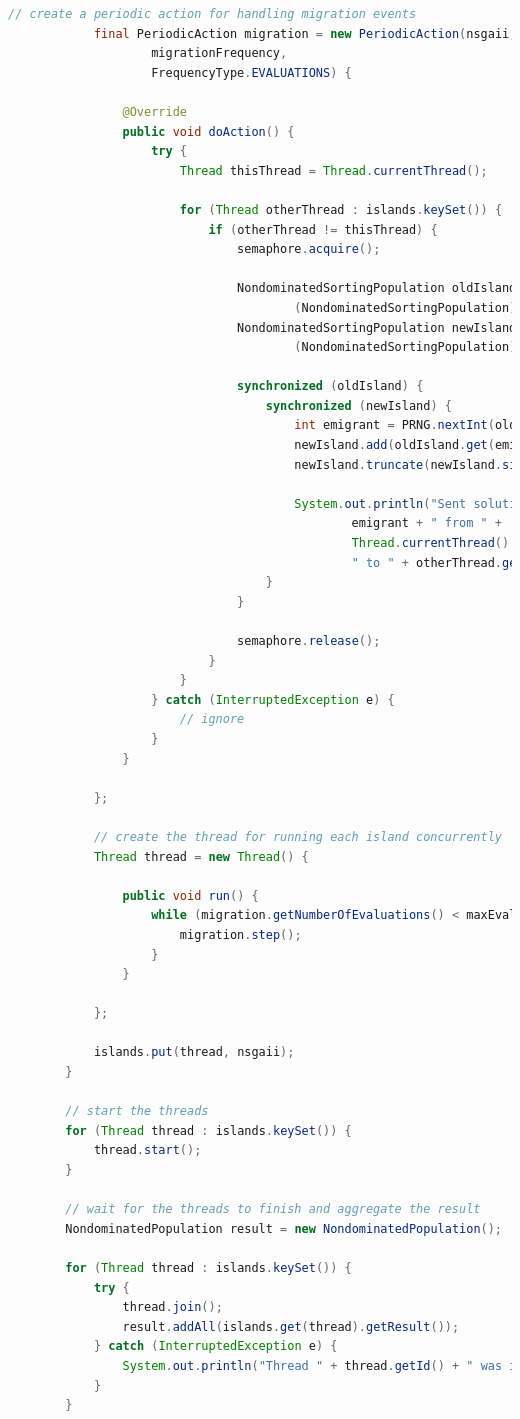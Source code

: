 {\begin{lstlisting}[language=Java]
			// create a periodic action for handling migration events
			final PeriodicAction migration = new PeriodicAction(nsgaii,
					migrationFrequency,
					FrequencyType.EVALUATIONS) {

				@Override
				public void doAction() {
					try {
						Thread thisThread = Thread.currentThread();
						
						for (Thread otherThread : islands.keySet()) {
							if (otherThread != thisThread) {
								semaphore.acquire();
								
								NondominatedSortingPopulation oldIsland = 
										(NondominatedSortingPopulation)islands.get(thisThread).getPopulation();
								NondominatedSortingPopulation newIsland = 
										(NondominatedSortingPopulation)islands.get(otherThread).getPopulation();
								
								synchronized (oldIsland) {
									synchronized (newIsland) {
										int emigrant = PRNG.nextInt(oldIsland.size());
										newIsland.add(oldIsland.get(emigrant).copy());
										newIsland.truncate(newIsland.size()-1);
										
										System.out.println("Sent solution " +
												emigrant + " from " + 
												Thread.currentThread().getName() + 
												" to " + otherThread.getName());
									}
								}
								
								semaphore.release();
							}
						}
					} catch (InterruptedException e) {
						// ignore
					}
				}
				
			};
			
			// create the thread for running each island concurrently
			Thread thread = new Thread() {
				
				public void run() {
					while (migration.getNumberOfEvaluations() < maxEvaluations) {
						migration.step();
					}
				}
				
			};
			
			islands.put(thread, nsgaii);
		}
		
		// start the threads
		for (Thread thread : islands.keySet()) {
			thread.start();
		}
		
		// wait for the threads to finish and aggregate the result
		NondominatedPopulation result = new NondominatedPopulation();
		
		for (Thread thread : islands.keySet()) {
			try {
				thread.join();
				result.addAll(islands.get(thread).getResult());
			} catch (InterruptedException e) {
				System.out.println("Thread " + thread.getId() + " was interrupted!");
			}
		}
		

\end{lstlisting}}
